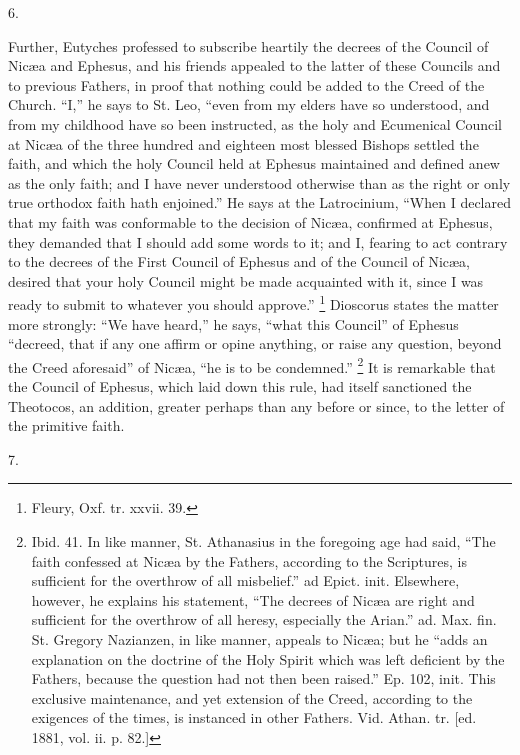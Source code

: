 6.

Further, Eutyches professed to subscribe heartily the decrees of
the Council of Nicæa and Ephesus, and his friends appealed to the
latter of these Councils and to previous Fathers, in proof that
nothing could be added to the Creed of the Church. ``I,'' he
says to St. Leo, ``even from my elders have so understood, and
from my childhood have so been instructed, as the holy and Ecumenical
Council at Nicæa of the three hundred and eighteen most blessed
Bishops settled the faith, and which the holy Council held at Ephesus
maintained and defined anew as the only faith; and I have never
understood otherwise than as the right or only true orthodox faith
hath enjoined.'' He says at the Latrocinium, ``When I declared
that my faith was conformable to the decision of Nicæa, confirmed at
Ephesus, they demanded that I should add some words to it; and I,
fearing to act contrary to the decrees of the First Council of Ephesus
and of the Council of Nicæa, desired that your holy Council might be
made acquainted with it, since I was ready to submit to whatever you
should approve.'' \footnote{Fleury, Oxf. tr. xxvii. 39.}
Dioscorus states the matter more strongly: ``We have heard,''
he says, ``what this Council'' of Ephesus ``decreed, that
if any one affirm or opine anything, or raise any question, beyond the
Creed aforesaid'' of Nicæa, ``he is to be condemned.'' \footnote{Ibid. 41. In like manner, St. Athanasius
in the foregoing age had said, ``The faith confessed at Nicæa by
the Fathers, according to the Scriptures, is sufficient for the
overthrow of all misbelief.'' ad Epict. init. Elsewhere, however,
he explains his statement, ``The decrees of Nicæa are right and
sufficient for the overthrow of all heresy, especially the
Arian.'' ad. Max. fin. St. Gregory Nazianzen, in like manner,
appeals to Nicæa; but he ``adds an explanation on the doctrine of
the Holy Spirit which was left deficient by the Fathers, because the
question had not then been raised.'' Ep. 102, init. This exclusive
maintenance, and yet extension of the Creed, according to the
exigences of the times, is instanced in other Fathers. Vid. Athan. tr.
[ed. 1881, vol. ii. p. 82.]} It is remarkable that the Council of Ephesus, which laid down
this rule, had itself sanctioned the Theotocos, an addition, greater
perhaps than any before or since, to the letter of the primitive
faith.

7.

